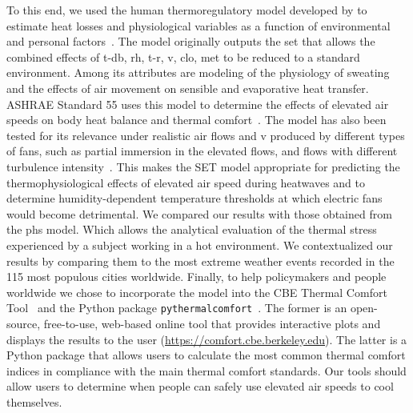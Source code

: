 To this end, we used the human thermoregulatory model developed by  to estimate heat losses and physiological variables as a function of environmental and personal factors~\cite{Gagge1986}.
The model originally outputs the \ac{set} that allows the combined effects of \ac{t-db}, \ac{rh}, \ac{t-r}, \ac{v}, \ac{clo}, \ac{met} to be reduced to a standard environment.
Among its attributes are modeling of the physiology of sweating and the effects of air movement on sensible and evaporative heat transfer.
ASHRAE Standard 55 uses this model to determine the effects of elevated air speeds on body heat balance and thermal comfort~\cite{ashrae552017}.
The model has also been tested for its relevance under realistic air flows and \ac{v} produced by different types of fans, such as partial immersion in the elevated flows, and flows with different turbulence intensity~\cite{Huang2014}.
This makes the SET model appropriate for predicting the thermophysiological effects of elevated air speed during heatwaves and to determine humidity-dependent temperature thresholds at which electric fans would become detrimental.
We compared our results with those obtained from the \ac{phs} model.
Which allows the analytical evaluation of the thermal stress experienced by a subject working in a hot environment.
We contextualized our results by comparing them to the most extreme weather events recorded in the 115 most populous cities worldwide.
Finally, to help policymakers and people worldwide we chose to incorporate the model into the CBE Thermal Comfort Tool~\cite{Tartarini2020} and the Python package \verb|pythermalcomfort|~\cite{Tartarini2020a}.
The former is an open-source, free-to-use, web-based online tool that provides interactive plots and displays the results to the user (\url{https://comfort.cbe.berkeley.edu}).
The latter is a Python package that allows users to calculate the most common thermal comfort indices in compliance with the main thermal comfort standards.
Our tools should allow users to determine when people can safely use elevated air speeds to cool themselves.